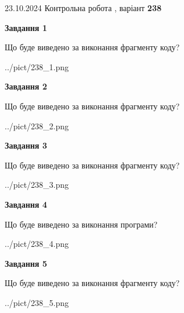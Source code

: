 \documentclass[12pt, ukrainian]{article}
\begin{document}
{\Large{23.10.2024 Контрольна робота , варіант  \No \textbf { 238 }\par}}
{
\begin {large}
{\begin {center}\textbf{Завдання 1}\end {center}}

Що буде виведено за виконання фрагменту коду?\par
\begin{center}
	{../pict/238_1.png}
\end{center}
\newpage

{\begin {center}\textbf{Завдання 2}\end {center}}

Що буде виведено за виконання фрагменту коду?\par
\begin{center}
	{../pict/238_2.png}
\end{center}
\newpage

{\begin {center}\textbf{Завдання 3}\end {center}}

Що буде виведено за виконання фрагменту коду?\par
\begin{center}
	{../pict/238_3.png}
\end{center}
\newpage

{\begin {center}\textbf{Завдання 4}\end {center}}

Що буде виведено за виконання програми?\par
\begin{center}
	{../pict/238_4.png}
\end{center}
\newpage

{\begin {center}\textbf{Завдання 5}\end {center}}

Що буде виведено за виконання фрагменту коду?\par
\begin{center}
	{../pict/238_5.png}
\end{center}
\newpage


\end{large}}
\end{document}
